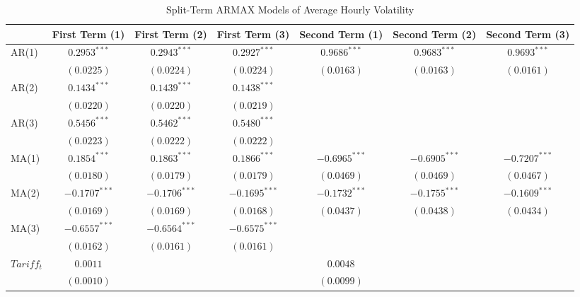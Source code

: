 \documentclass[
]{article}
\begin{document}
{\begin{appendix}
\begin{table}
\caption{Split-Term ARMAX Models of Average Hourly Volatility}
\begin{center}
\begin{tabular}{l c c c c c c}
\hline
 & First Term (1) & First Term (2) & First Term (3) & Second Term (1) & Second Term (2) & Second Term (3) \\
\hline
AR(1)          & $0.2953^{***}$  & $0.2943^{***}$  & $0.2927^{***}$  & $0.9686^{***}$  & $0.9683^{***}$  & $0.9693^{***}$  \\
               & $(0.0225)$      & $(0.0224)$      & $(0.0224)$      & $(0.0163)$      & $(0.0163)$      & $(0.0161)$      \\
AR(2)          & $0.1434^{***}$  & $0.1439^{***}$  & $0.1438^{***}$  &                 &                 &                 \\
               & $(0.0220)$      & $(0.0220)$      & $(0.0219)$      &                 &                 &                 \\
AR(3)          & $0.5456^{***}$  & $0.5462^{***}$  & $0.5480^{***}$  &                 &                 &                 \\
               & $(0.0223)$      & $(0.0222)$      & $(0.0222)$      &                 &                 &                 \\
MA(1)          & $0.1854^{***}$  & $0.1863^{***}$  & $0.1866^{***}$  & $-0.6965^{***}$ & $-0.6905^{***}$ & $-0.7207^{***}$ \\
               & $(0.0180)$      & $(0.0179)$      & $(0.0179)$      & $(0.0469)$      & $(0.0469)$      & $(0.0467)$      \\
MA(2)          & $-0.1707^{***}$ & $-0.1706^{***}$ & $-0.1695^{***}$ & $-0.1732^{***}$ & $-0.1755^{***}$ & $-0.1609^{***}$ \\
               & $(0.0169)$      & $(0.0169)$      & $(0.0168)$      & $(0.0437)$      & $(0.0438)$      & $(0.0434)$      \\
MA(3)          & $-0.6557^{***}$ & $-0.6564^{***}$ & $-0.6575^{***}$ &                 &                 &                 \\
               & $(0.0162)$      & $(0.0161)$      & $(0.0161)$      &                 &                 &                 \\
$Tariff_{t}$   & $0.0011$        &                 &                 & $0.0048$        &                 &                 \\
               & $(0.0010)$      &                 &                 & $(0.0099)$      &                 &                 \\

\end{tabular}
\end{center}
\end{table}
\end{appendix}}
\end{document}
